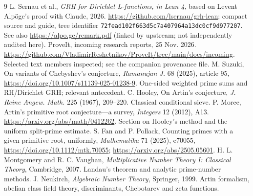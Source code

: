 \documentclass[11pt,letterpaper]{article}
\theoremstyle{definition}\newtheorem{definition}[theorem]{Definition}
\theoremstyle{remark}\newtheorem{remark}[theorem]{Remark}
\begin{document}
\begin{thebibliography}{9}\small
{} L. Sernau et al., \emph{GRH for Dirichlet L-functions, in Lean 4}, based on Levent Alp\"oge's proof with Claude, 2026. \url{https://github.com/lsernau/grh-lean}; compact source and guide, tree identifier \nolinkurl{72fead102f663d5c7a407964a13dc0cf9d977207}. See also \url{https://alpo.ge/remark.pdf} (linked by upstream; not independently audited here).
 ProveIt, incoming research reports, 25 Nov. 2026. \url{https://github.com/VladimirReshetnikov/ProveIt/tree/main/docs/incoming}. Selected text members inspected; see the companion provenance file.
 M. Suzuki, On variants of Chebyshev's conjecture, \emph{Ramanujan J.} 68 (2025), article 95, \url{https://doi.org/10.1007/s11139-025-01238-9}. One-sided weighted prime sums and RH/Dirichlet GRH; relevant antecedent.
 C. Hooley, On Artin's conjecture, \emph{J. Reine Angew. Math.} 225 (1967), 209--220. Classical conditional sieve.
 P. Moree, Artin's primitive root conjecture---a survey, \emph{Integers} 12 (2012), A13. \url{https://arxiv.org/abs/math/0412262}. Section on Hooley's method and the uniform split-prime estimate.
 S. Fan and P. Pollack, Counting primes with a given primitive root, uniformly, \emph{Mathematika} 71 (2025), e70055, \url{https://doi.org/10.1112/mtk.70055}; \url{https://arxiv.org/abs/2505.05601}.
 H. L. Montgomery and R. C. Vaughan, \emph{Multiplicative Number Theory I: Classical Theory}, Cambridge, 2007. Landau's theorem and analytic prime-number methods.
 J. Neukirch, \emph{Algebraic Number Theory}, Springer, 1999. Artin formalism, abelian class field theory, discriminants, Chebotarev and zeta functions.
\end{thebibliography}
\end{document}
